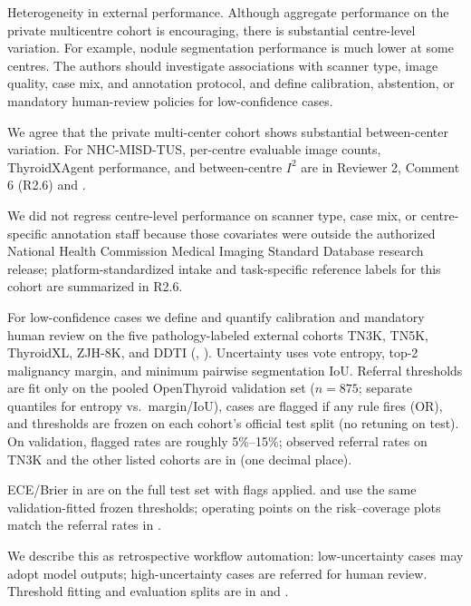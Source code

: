 \begin{reviewercomment}
Heterogeneity in external performance. Although aggregate performance on the private multicentre cohort is encouraging, there is substantial centre-level variation. For example, nodule segmentation performance is much lower at some centres. The authors should investigate associations with scanner type, image quality, case mix, and annotation protocol, and define calibration, abstention, or mandatory human-review policies for low-confidence cases.
\end{reviewercomment}
\begin{authorresponse}
We agree that the private multi-center cohort shows substantial between-center variation. For NHC-MISD-TUS, per-centre evaluable image counts, ThyroidXAgent performance, and between-centre $I^2$ are in Reviewer 2, Comment 6 (R2.6) and .\par
We did not regress centre-level performance on scanner type, case mix, or centre-specific annotation staff because those covariates were outside the authorized National Health Commission Medical Imaging Standard Database research release; platform-standardized intake and task-specific reference labels for this cohort are summarized in R2.6.\par
For low-confidence cases we define and quantify calibration and mandatory human review on the five pathology-labeled external cohorts TN3K, TN5K, ThyroidXL, ZJH-8K, and DDTI (, ). Uncertainty uses vote entropy, top-2 malignancy margin, and minimum pairwise segmentation IoU. Referral thresholds are fit only on the pooled OpenThyroid validation set ($n{=}875$; separate quantiles for entropy vs.\ margin/IoU), cases are flagged if any rule fires (OR), and thresholds are frozen on each cohort's official test split (no retuning on test). On validation, flagged rates are roughly 5\%--15\%; observed referral rates on TN3K and the other listed cohorts are in  (one decimal place).\par
ECE/Brier in  are on the full test set with flags applied.  and  use the same validation-fitted frozen thresholds; operating points on the risk–coverage plots match the referral rates in .\par
We describe this as retrospective workflow automation: low-uncertainty cases may adopt model outputs; high-uncertainty cases are referred for human review. Threshold fitting and evaluation splits are in  and .\par
\par
\end{authorresponse}

